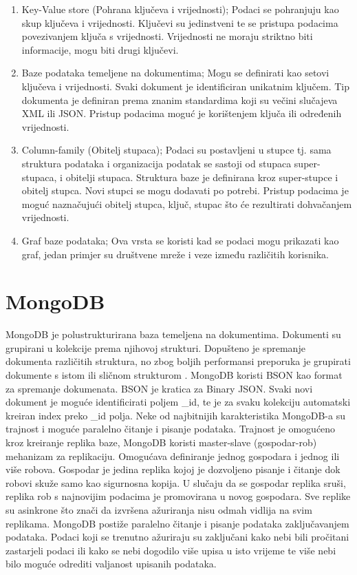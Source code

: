 \documentclass[]{foi}
\begin{document}
\begin{enumerate}
    \item Key-Value store (Pohrana ključeva i vrijednosti); Podaci se pohranjuju kao skup ključeva i vrijednosti.
        Ključevi su jedinstveni te se pristupa podacima povezivanjem ključa s vrijednosti.
        Vrijednosti ne moraju striktno biti informacije, mogu biti drugi ključevi.
    \item Baze podataka temeljene na dokumentima; Mogu se definirati kao setovi ključeva i vrijednosti.
        Svaki dokument je identificiran unikatnim ključem. Tip dokumenta je definiran prema znanim standardima
        koji su večini slučajeva XML ili JSON. Pristup podacima moguć je korištenjem ključa ili određenih vrijednosti.
    \item Column-family (Obitelj stupaca); Podaci su postavljeni u stupce tj. sama struktura podataka i organizacija podatak
        se sastoji od stupaca super-stupaca, i obitelji stupaca. Struktura baze je definirana kroz super-stupce i obitelj stupca.
        Novi stupci se mogu dodavati po potrebi. Pristup podacima je moguć naznačujući obitelj stupca, ključ, stupac što će
        rezultirati dohvačanjem vrijednosti.
    \item Graf baze podataka; Ova vrsta se koristi kad se podaci mogu prikazati kao graf, jedan primjer su društvene mreže
        i veze između različitih korisnika.
\end{enumerate}

\section{MongoDB}

MongoDB je polustrukturirana baza temeljena na dokumentima. Dokumenti su grupirani u kolekcije prema njihovoj strukturi.
Dopušteno je spremanje dokumenta različitih struktura, no zbog boljih performansi preporuka je grupirati dokumente s 
istom ili sličnom strukturom \cite{abramova2013nosql}. MongoDB koristi BSON kao format za spremanje dokumenata. BSON je kratica za Binary JSON.
Svaki novi dokument je moguće identificirati poljem \_id, te je za svaku kolekciju automatski kreiran index preko \_id polja.
Neke od najbitnijih karakteristika MongoDB-a su trajnost i moguće paralelno čitanje i pisanje podataka.
Trajnost je omogućeno kroz kreiranje replika baze, MongoDB koristi master-slave (gospodar-rob) mehanizam za replikaciju.
Omogućava definiranje jednog gospodara i jednog ili više robova. Gospodar je jedina replika kojoj je dozvoljeno pisanje i čitanje 
dok robovi skuže samo kao sigurnosna kopija. U slučaju da se gospodar replika sruši, replika rob s najnovijim podacima je promovirana
u novog gospodara. Sve replike su asinkrone što znači da izvršena ažuriranja nisu odmah vidlija na svim replikama.
MongoDB postiže paralelno čitanje i pisanje podataka zaključavanjem podataka. Podaci koji se trenutno ažuriraju su zaključani
kako nebi bili pročitani zastarjeli podaci ili kako se nebi dogodilo više upisa u isto vrijeme te više nebi bilo moguće
odrediti valjanost upisanih podataka.
\end{document}
